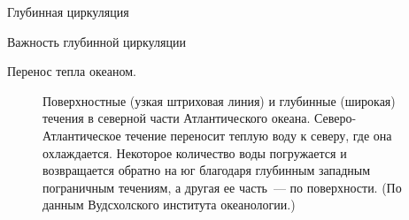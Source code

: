 \begin{chapter}{Глубинная циркуляция}
\begin{section}{Важность глубинной циркуляции}
\begin{paragraph}{Перенос тепла океаном.}
\begin{figure}[t!]
\caption{Поверхностные (узкая штриховая линия) и глубинные (широкая)
течения в северной части Атлантического океана. Северо-Атлантическое
течение переносит теплую воду к северу, где она охлаждается. Некоторое 
количество воды погружается и возвращается обратно на юг благодаря глубинным
западным пограничным течениям, а другая ее часть~--- по поверхности. 
(По данным Вудсхолского института океанологии.)}
\label{fig:fig13-1}
\end{figure}
%


\end{paragraph}
\end{section}
\end{chapter}
